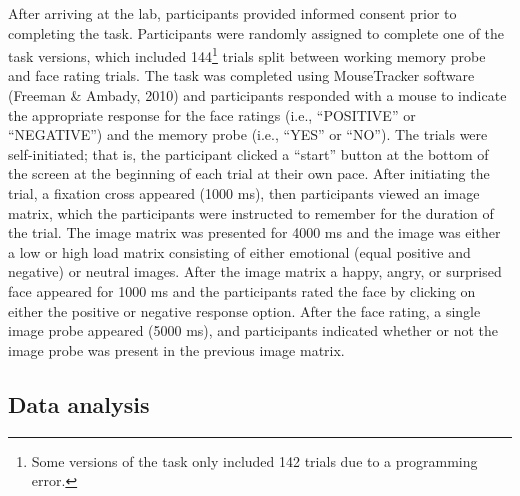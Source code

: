\documentclass[man]{apa6}
\let\rmarkdownfootnote\footnote%
\def\footnote{\protect\rmarkdownfootnote}
\begin{document}
After arriving at the lab, participants provided informed consent prior to completing the task. Participants were randomly assigned to complete one of the task versions, which included 144\footnote{Some versions of the task only included 142 trials due to a programming error.} trials split between working memory probe and face rating trials. The task was completed using MouseTracker software (Freeman \& Ambady, 2010) and participants responded with a mouse to indicate the appropriate response for the face ratings (i.e., \enquote{POSITIVE} or \enquote{NEGATIVE}) and the memory probe (i.e., \enquote{YES} or \enquote{NO}). The trials were self-initiated; that is, the participant clicked a \enquote{start} button at the bottom of the screen at the beginning of each trial at their own pace. After initiating the trial, a fixation cross appeared (1000 ms), then participants viewed an image matrix, which the participants were instructed to remember for the duration of the trial. The image matrix was presented for 4000 ms and the image was either a low or high load matrix consisting of either emotional (equal positive and negative) or neutral images. After the image matrix a happy, angry, or surprised face appeared for 1000 ms and the participants rated the face by clicking on either the positive or negative response option. After the face rating, a single image probe appeared (5000 ms), and participants indicated whether or not the image probe was present in the previous image matrix.

\hypertarget{data-analysis}{%
\subsection{Data analysis}\label{data-analysis}}
\end{document}
